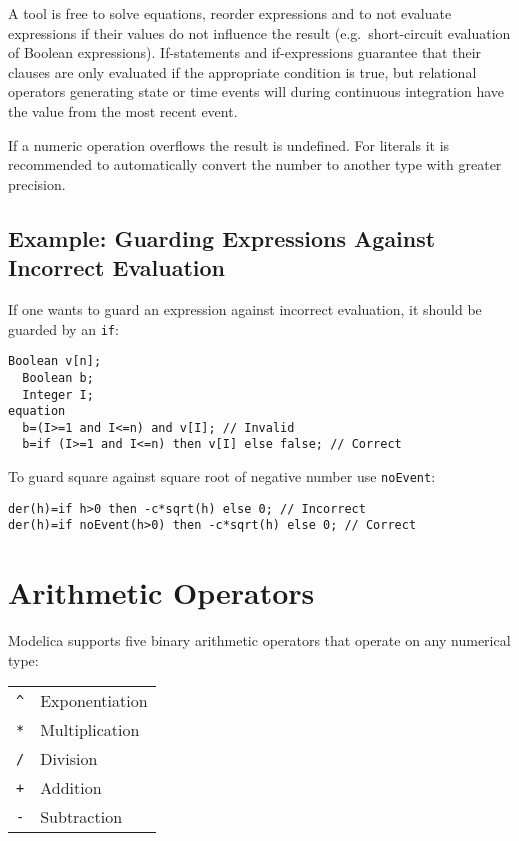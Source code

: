 A tool is free to solve equations, reorder expressions and to not evaluate expressions if their values do not influence the result (e.g.\ short-circuit
evaluation of Boolean expressions).  If-statements and if-expressions guarantee that their clauses are only evaluated if the appropriate condition is true,
but relational operators generating state or time events will during continuous integration have the value from the most recent event.

If a numeric operation overflows the result is undefined. For literals
it is recommended to automatically convert the number to another type
with greater precision.

\subsection{Example: Guarding Expressions Against Incorrect Evaluation}

\begin{example}
If one wants to guard an expression against incorrect evaluation, it should be guarded by an \lstinline!if!:
\begin{lstlisting}[language=modelica]
  Boolean v[n];
  Boolean b;
  Integer I;
equation
  b=(I>=1 and I<=n) and v[I]; // Invalid
  b=if (I>=1 and I<=n) then v[I] else false; // Correct
\end{lstlisting}

To guard square against square root of negative number use \lstinline!noEvent!:
\begin{lstlisting}[language=modelica]
der(h)=if h>0 then -c*sqrt(h) else 0; // Incorrect
der(h)=if noEvent(h>0) then -c*sqrt(h) else 0; // Correct
\end{lstlisting}
\end{example}

\section{Arithmetic Operators}

Modelica supports five binary arithmetic operators that operate on any
numerical type:
\begin{longtable}[c]{ll}
\lstinline!^! & Exponentiation\\
\lstinline!*! & Multiplication\\
\lstinline!/! & Division\\
\lstinline!+! & Addition\\
\lstinline!-! & Subtraction\\
\end{longtable}

